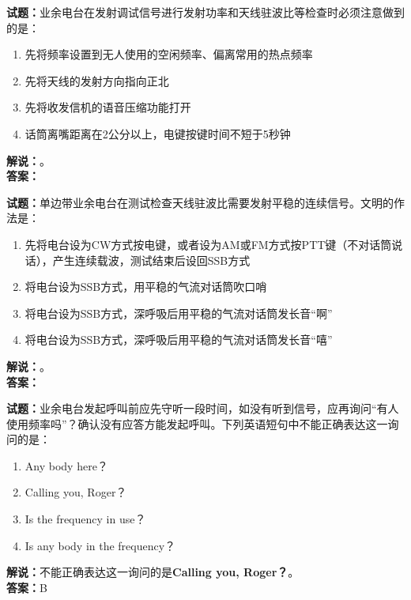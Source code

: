 \documentclass{ctexbook}
\begin{document}
\vspace{\baselineskip}

\noindent\textbf{试题：}业余电台在发射调试信号进行发射功率和天线驻波比等检查时必须注意做到的是：
\begin{enumerate}[leftmargin=3em]
  \item 先将频率设置到无人使用的空闲频率、偏离常用的热点频率
  \item 先将天线的发射方向指向正北
  \item 先将收发信机的语音压缩功能打开
  \item 话筒离嘴距离在2公分以上，电键按键时间不短于5秒钟
\end{enumerate}
\noindent\textbf{解说：}\textbf{}。\\\noindent\textbf{答案：}

\vspace{\baselineskip}

\noindent\textbf{试题：}单边带业余电台在测试检查天线驻波比需要发射平稳的连续信号。文明的作法是：
\begin{enumerate}[leftmargin=3em]
  \item 先将电台设为CW方式按电键，或者设为AM或FM方式按PTT键（不对话筒说话），产生连续载波，测试结束后设回SSB方式
  \item 将电台设为SSB方式，用平稳的气流对话筒吹口哨
  \item 将电台设为SSB方式，深呼吸后用平稳的气流对话筒发长音“啊”
  \item 将电台设为SSB方式，深呼吸后用平稳的气流对话筒发长音“嘻”
\end{enumerate}
\noindent\textbf{解说：}\textbf{}。\\\noindent\textbf{答案：}

\vspace{\baselineskip}

\noindent\textbf{试题：}业余电台发起呼叫前应先守听一段时间，如没有听到信号，应再询问“有人使用频率吗”？确认没有应答方能发起呼叫。下列英语短句中不能正确表达这一询问的是：
\begin{enumerate}[leftmargin=3em]
  \item Any body here？
  \item Calling you, Roger？
  \item Is the frequency in use？
  \item Is any body in the frequency？
\end{enumerate}
\noindent\textbf{解说：}不能正确表达这一询问的是\textbf{Calling you, Roger？}。\\\noindent\textbf{答案：}B
\end{document}

